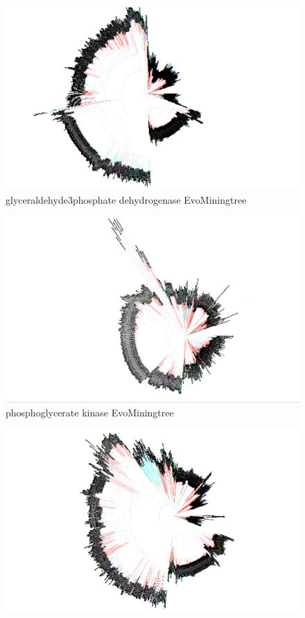 \documentclass[12pt,twoside]{reedthesis}
\begin{document}
\begin{figure}[h!tbp]
  \centering
  \includegraphics[angle = 180,scale = 0.25]{chapter2/Cyanobacteria/tree11.png}
  \caption[glyceraldehyde3phosphate dehydrogenase EvoMiningtree]{\normalsize{glyceraldehyde3phosphate dehydrogenase EvoMiningtree}}
  \label{fig:glyceraldehyde3phosphate_dehydrogenase_evo_tree}
  \end{figure}\begin{figure}[h!tbp]
  \centering
  \includegraphics[angle = 180,scale = 0.25]{chapter2/Cyanobacteria/tree12.png}
  \caption[phosphoglycerate kinase EvoMiningtree]{\normalsize{phosphoglycerate kinase EvoMiningtree}}
  \label{fig:phosphoglycerate_kinase_evo_tree}
  \end{figure}\begin{figure}[h!tbp]
  \centering
  \includegraphics[angle = 180,scale = 0.25]{chapter2/Cyanobacteria/tree13.png}

\end{figure}
\end{document}
